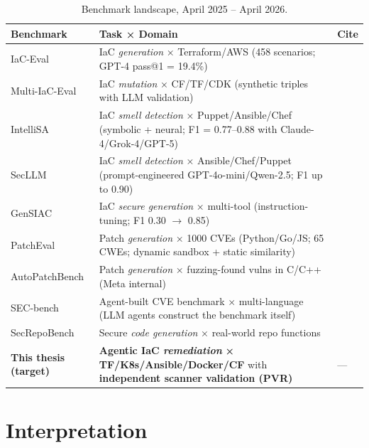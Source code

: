 \documentclass[11pt, a4paper]{report}
\begin{document}
\begin{table}[H]
  \centering
  \caption{Benchmark landscape, April 2025 -- April 2026.}
  \label{tab:landscape}
  \small
  \begin{tabularx}{\linewidth}{l X l}
    \toprule
    \textbf{Benchmark} & \textbf{Task × Domain} & \textbf{Cite} \\
    \midrule
    IaC-Eval & IaC \emph{generation} × Terraform/AWS (458 scenarios;
    GPT-4 pass@1 = 19.4\%) & \citep{kon2024iaceval} \\
    Multi-IaC-Eval & IaC \emph{mutation} × CF/TF/CDK (synthetic triples
    with LLM validation) & \citep{multi2025iaceval} \\
    IntelliSA & IaC \emph{smell detection} × Puppet/Ansible/Chef
    (symbolic + neural; F1 = 0.77--0.88 with Claude-4/Grok-4/GPT-5)
    & \citep{intellisa2026} \\
    SecLLM & IaC \emph{smell detection} × Ansible/Chef/Puppet
    (prompt-engineered GPT-4o-mini/Qwen-2.5; F1 up to 0.90)
    & \citep{devito2025secllm} \\
    GenSIAC & IaC \emph{secure generation} × multi-tool (instruction-tuning;
    F1 0.30 $\to$ 0.85) & \citep{li2025gensiac} \\
    \midrule
    PatchEval & Patch \emph{generation} × 1000 CVEs (Python/Go/JS; 65 CWEs;
    dynamic sandbox + static similarity) & \citep{lyu2024patcheval} \\
    AutoPatchBench & Patch \emph{generation} × fuzzing-found vulns in
    C/C++ (Meta internal) & \citep{autopatchbench2025} \\
    SEC-bench & Agent-built CVE benchmark × multi-language (LLM agents
    construct the benchmark itself) & \citep{secbench2025} \\
    SecRepoBench & Secure \emph{code generation} × real-world repo
    functions & \citep{secrepobench2025} \\
    \midrule
    \rowcolor{yellow!12}
    \textbf{This thesis (target)} &
    \textbf{Agentic IaC \emph{remediation}} \textbf{×}
    \textbf{TF/K8s/Ansible/Docker/CF} with \textbf{independent scanner
    validation (PVR)} &
    --- \\
    \bottomrule
  \end{tabularx}
\end{table}

\section{Interpretation}
\end{document}
